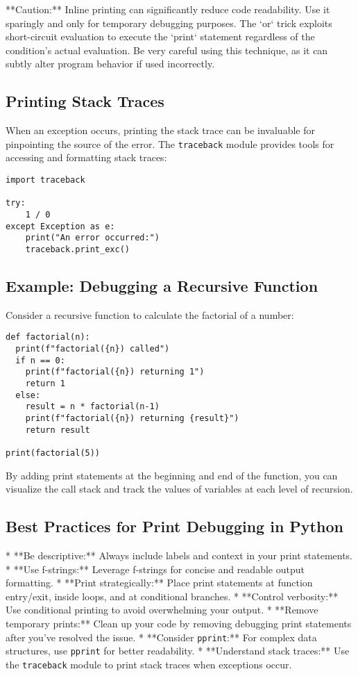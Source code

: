 \documentclass{article}
\begin{document}
{{{{**Caution:** Inline printing can significantly reduce code readability. Use it sparingly and only for temporary debugging purposes. The `or` trick exploits short-circuit evaluation to execute the `print` statement regardless of the condition's actual evaluation.  Be very careful using this technique, as it can subtly alter program behavior if used incorrectly.

\subsection*{Printing Stack Traces}

When an exception occurs, printing the stack trace can be invaluable for pinpointing the source of the error. The \texttt{traceback} module provides tools for accessing and formatting stack traces:

\begin{verbatim}
import traceback

try:
    1 / 0
except Exception as e:
    print("An error occurred:")
    traceback.print_exc()
\end{verbatim}

\subsection*{Example: Debugging a Recursive Function}

Consider a recursive function to calculate the factorial of a number:

\begin{verbatim}
def factorial(n):
  print(f"factorial({n}) called")
  if n == 0:
    print(f"factorial({n}) returning 1")
    return 1
  else:
    result = n * factorial(n-1)
    print(f"factorial({n}) returning {result}")
    return result

print(factorial(5))
\end{verbatim}

By adding print statements at the beginning and end of the function, you can visualize the call stack and track the values of variables at each level of recursion.

\subsection*{Best Practices for Print Debugging in Python}

*   **Be descriptive:**  Always include labels and context in your print statements.
*   **Use f-strings:** Leverage f-strings for concise and readable output formatting.
*   **Print strategically:**  Place print statements at function entry/exit, inside loops, and at conditional branches.
*   **Control verbosity:** Use conditional printing to avoid overwhelming your output.
*   **Remove temporary prints:**  Clean up your code by removing debugging print statements after you've resolved the issue.
*   **Consider \texttt{pprint}:** For complex data structures, use \texttt{pprint} for better readability.
*   **Understand stack traces:**  Use the \texttt{traceback} module to print stack traces when exceptions occur.

}}}}
\end{document}
